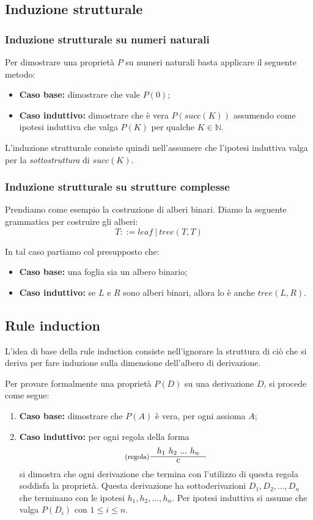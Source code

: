 \documentclass[a4paper, 11pt]{article}
\begin{document}
\subsection{Induzione strutturale}
\subsubsection{Induzione strutturale su numeri naturali}
Per dimostrare una proprietà $P$ su numeri naturali basta applicare il seguente metodo: \begin{itemize}
	\item \textbf{Caso base:} dimostrare che vale $P(0)$;
	\item \textbf{Caso induttivo:} dimostrare che è vera $P(succ(K))$ assumendo come ipotesi induttiva che valga $P(K)$ per qualche $K \in \mathbb{N}$.
\end{itemize}

L'induzione strutturale consiste quindi nell'assumere che l'ipotesi induttiva valga per la \textit{sottostruttura} di $succ(K)$.

\subsubsection{Induzione strutturale su strutture complesse}
Prendiamo come esempio la costruzione di alberi binari. Diamo la seguente grammatica per costruire gli alberi: \[ T::= leaf\ |\ tree(T,T) \]

In tal caso partiamo col presupposto che: \begin{itemize}
		\item \textbf{Caso base:} una foglia sia un albero binario;
		\item \textbf{Caso induttivo:} se $L$ e $R$ sono alberi binari, allora lo è anche $tree(L,R)$.
\end{itemize}

\subsection{Rule induction}
L'idea di base della rule induction consiste nell'ignorare la struttura di ciò che si deriva per fare induzione sulla dimensione dell'albero di derivazione.

Per provare formalmente una proprietà $P(D)$ su una derivazione $D$, si procede come segue: \begin{enumerate}
	\item \textbf{Caso base:} dimostrare che $P(A)$ è vera, per ogni assioma $A$;
	\item \textbf{Caso induttivo:} per ogni regola della forma \[ \inference[(regola)]{h_1\ h_2\ ...\ h_n}{c} \] si dimostra che ogni derivazione che termina con l'utilizzo di questa regola soddisfa la proprietà. Questa derivazione ha sottoderivazioni $D_1, D_2,...,D_n$ che terminano con le ipotesi $h_1, h_2,...,h_n$. Per ipotesi induttiva si assume che valga $P(D_i)$ con $1\leq i \leq n$.
	
\end{enumerate}
\newpage
\end{document}
